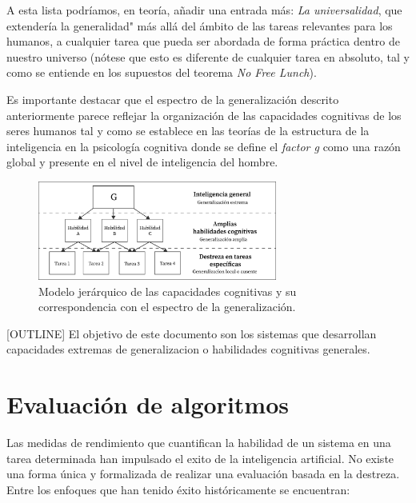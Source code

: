 A esta lista podríamos, en teoría, añadir una entrada más: \textit{La universalidad}, que extendería la generalidad" más allá del ámbito de las tareas relevantes para los humanos, a cualquier tarea que pueda ser abordada de forma práctica dentro de nuestro universo (nótese que esto es diferente de cualquier tarea en absoluto, tal y como se entiende en los supuestos del teorema \textit{No Free Lunch}).

Es importante destacar que el espectro de la generalización descrito anteriormente parece reflejar la organización de las capacidades cognitivas de los seres humanos tal y como se establece en las teorías de la estructura de la inteligencia en la psicología cognitiva donde se define el \textit{factor g} como una razón global y presente en el nivel de inteligencia del hombre. 

\begin{figure}[ht!]
    \centering
    \includegraphics[width=0.7\textwidth]{Graphics/g-factor.png}
    \caption{Modelo jerárquico de las capacidades cognitivas y su correspondencia con el espectro de la generalización.}
    \label{fig:g-factor}
\end{figure}

[OUTLINE]
El objetivo de este documento son los sistemas que desarrollan capacidades extremas de generalizacion o habilidades cognitivas generales.

\section{Evaluación de algoritmos}\label{section:state-of-the-art:evaluating-algoritms}

Las medidas de rendimiento que cuantifican la habilidad de un sistema en una tarea determinada han impulsado el exito de la inteligencia artificial. No existe una forma única y formalizada de realizar una evaluación basada en la destreza. Entre los enfoques que han tenido éxito históricamente se encuentran:

